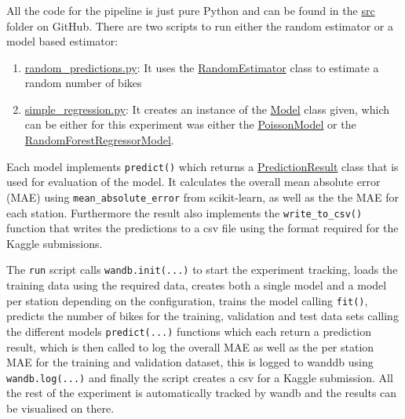 \documentclass[a4paper]{article}
\begin{document}
    \subsubsection*{}
    All the code for the pipeline is just pure Python and can be found in the
    \href{https://github.com/isabelladegen/mlp-2021/tree/main/src}{src} folder on GitHub. There are two
    scripts to run either the random estimator or a model based estimator:
    \begin{enumerate}
        \item \href{https://github.com/isabelladegen/mlp-2021/blob/main/src/random_predictions.py}{random\_predictions.py}:
        It uses the \href{https://github.com/isabelladegen/mlp-2021/blob/c48d85dc364b5a2e7e59f16961b32f9e6c245735/src/models/RandomEstimator.py}{RandomEstimator}
        class to estimate a random number of bikes
        \item \href{https://github.com/isabelladegen/mlp-2021/blob/main/src/simple_regression.py}{simple\_regression.py}: It creates
        an instance of the \href{https://github.com/isabelladegen/mlp-2021/blob/main/src/models/Model.py}{Model} class given, which
        can be either for this experiment was either the \href{https://github.com/isabelladegen/mlp-2021/blob/main/src/models/PoissonModel.py}{PoissonModel}
        or the \href{https://github.com/isabelladegen/mlp-2021/blob/main/src/models/RandomForestRegressorModel.py}{RandomForestRegressorModel}.
    \end{enumerate}

    Each model implements \texttt{predict()} which returns a  \href{https://github.com/isabelladegen/mlp-2021/blob/c48d85dc364b5a2e7e59f16961b32f9e6c245735/src/PredictionResult.py}{PredictionResult}
    class that is used for evaluation of the model. It calculates the overall mean absolute error (MAE) using \texttt{mean\_absolute\_error}
    from scikit-learn, as well as the the MAE for each station. Furthermore the result also implements the
    \texttt{write\_to\_csv()} function that writes the predictions to a csv file using the format required for the Kaggle submissions.

    The \texttt{run} script calls \texttt{wandb.init(...)} to start the experiment tracking, loads the training data using the required data,
    creates both a single model and a model per station depending on the configuration, trains the model calling \texttt{fit()},
    predicts the number of bikes for the training, validation and test data sets calling the different models \texttt{predict(...)}
    functions which each return a prediction result, which is then called to log the overall MAE as well as the per
    station MAE for the training and validation dataset, this is logged to wanddb using \texttt{wandb.log(...)} and finally
    the script creates a csv for a Kaggle submission. All the rest of the experiment is automatically tracked by wandb
    and the results can be visualised on there.
\end{document}
